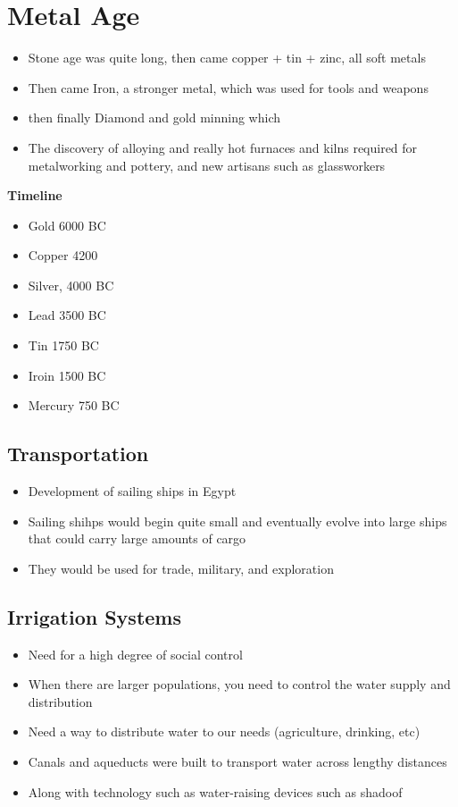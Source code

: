 \documentclass{article}
\begin{document}
\section*{Metal Age}
\begin{itemize}
  \item Stone age was quite long, then came copper + tin + zinc, all soft metals
  \item Then came Iron, a stronger metal, which was used for tools and weapons
  \item then finally Diamond and gold minning which
  \item The discovery of alloying and really hot furnaces and kilns
    required for metalworking and pottery, and new artisans such as glassworkers
\end{itemize}

\textbf{Timeline}
\begin{itemize}
  \item Gold 6000 BC
  \item Copper 4200
  \item Silver, 4000 BC
  \item Lead 3500 BC
  \item Tin 1750 BC
  \item Iroin 1500 BC
  \item Mercury 750 BC
\end{itemize}

\subsection{Transportation}
\begin{itemize}
  \item Development of sailing ships in Egypt
  \item Sailing shihps would begin quite small and eventually evolve
    into large ships that could carry large amounts of cargo
  \item They would be used for trade, military, and exploration
\end{itemize}

\subsection{Irrigation Systems}
\begin{itemize}
  \item Need for a high degree of social control
  \item When there are larger populations, you need to
    control the water supply and distribution
  \item Need a way to distribute water to our needs (agriculture, drinking, etc)
  \item Canals and aqueducts were built to transport water across lengthy distances
  \item Along with technology such as water-raising devices such as shadoof
\end{itemize}
\end{document}
